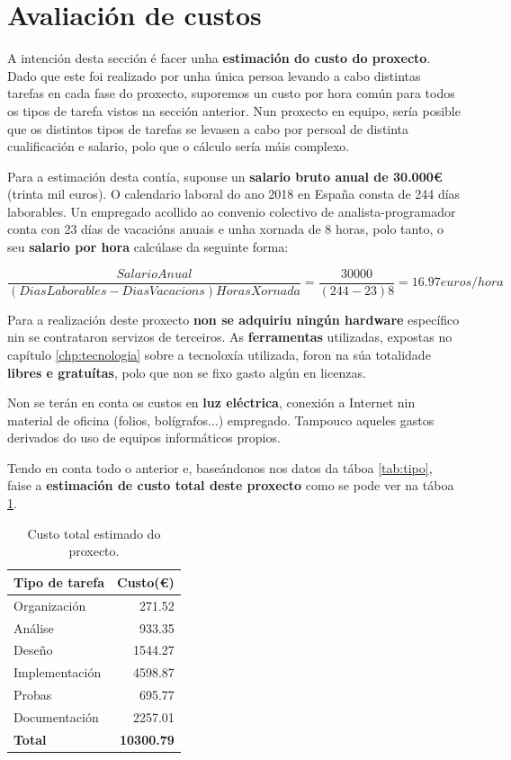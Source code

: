 \section{Avaliación de custos}

A intención desta sección é facer unha \textbf{estimación do custo do proxecto}. Dado que este foi realizado por unha única persoa levando a cabo distintas tarefas en cada fase do proxecto, suporemos un custo por hora común para todos os tipos de tarefa vistos na sección anterior. Nun proxecto en equipo, sería posible que os distintos tipos de tarefas se levasen a cabo por persoal de distinta cualificación e salario, polo que o cálculo sería máis complexo.

Para a estimación desta contía, suponse un \textbf{salario bruto anual de 30.000€} (trinta mil euros). O calendario laboral do ano 2018 en España consta de 244 días laborables. Un empregado acollido ao convenio colectivo de analista-programador conta con 23 días de vacacións anuais e unha xornada de 8 horas, polo tanto, o seu \textbf{salario por hora} calcúlase da seguinte forma:

\[ \dfrac{SalarioAnual}{(DiasLaborables - DiasVacacions) HorasXornada} = \dfrac{30000}{(244 - 23) 8} = 16.97 euros/hora \]

Para a realización deste proxecto \textbf{non se adquiriu ningún hardware} específico nin se contrataron servizos de terceiros. As \textbf{ferramentas} utilizadas, expostas no capítulo \ref{chp:tecnologia} sobre a tecnoloxía utilizada, foron na súa totalidade \textbf{libres e gratuítas}, polo que non se fixo gasto algún en licenzas.

Non se terán en conta os custos en \textbf{luz eléctrica}, conexión a Internet nin material de oficina (folios, bolígrafos...) empregado. Tampouco aqueles gastos derivados do uso de equipos informáticos propios.

Tendo en conta todo o anterior e, baseándonos nos datos da táboa \ref{tab:tipo}, faise a \textbf{estimación de custo total deste proxecto} como se pode ver na táboa \ref{tab:custo_final}.


\begin{table}[H]
	\centering
	\begin{tabular}{|p{8cm}|r|}
		\hline
		\rowcolor{blue!10}
		Tipo de tarefa & Custo(€)\\
		\hline
		Organización & 271.52\\
		\hline
		Análise & 933.35\\
		\hline
		Deseño &  1544.27\\
		\hline
		Implementación &  4598.87\\
		\hline
		Probas &  695.77\\
		\hline
		Documentación &  2257.01\\
		\hline
		\textbf{Total} &  \textbf{10300.79}\\
		\hline
	\end{tabular}
	\caption{Custo total estimado do proxecto.}
	\label{tab:custo_final}
\end{table}

